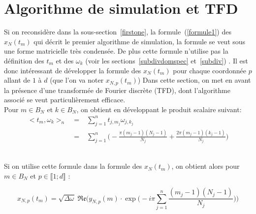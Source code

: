 \section{Algorithme de simulation et TFD}

Si on reconsidère dans la sous-section~\ref{firstone}, la formule~(\ref{formule1}) des $x_N(t_m)$ qui décrit le premier algorithme de simulation, la formule se veut sous une forme
matricielle très condensée. De plus cette formule n'utilise pas la définition des $t_m$ et des $\omega_k$ (voir les sections~\ref{subdivdomspec} et~\ref{subdiv})
. Il est donc intéressant de développer la formule des $x_N(t_m)$ pour chaque coordonnée $p$ allant de $1$ à $d$ (que l'on va noter $x_{N,p}(t_m)$)
Dans cette section, on met en avant la présence d'une transformée de
Fourier discrète (TFD), dont l'algorithme associé se veut particulièrement efficace.\\


\noindent Pour $m \in B_N$ et $k \in B_N$, on obtient en développant le produit scalaire suivant:
\begin{eqnarray*}
  <t_m,\omega_k>_{n} \; &=&  \; \displaystyle\sum_{j = 1}^{n} t_{j,m_j} \omega_{j,k_j} \\ 
  &=& \; \displaystyle\sum_{j = 1}^{n} \biggl( -\frac{\pi (m_j - 1)(N_j - 1)}{N_j} + \frac{2\pi(m_j - 1)(k_j -1)}{N_j} \biggr)
\end{eqnarray*}
 
~\\
\noindent Si on utilise cette formule dans la formule des $x_N(t_m)$, on obtient alors pour $m \in B_N$ et $p \in \llbracket 1;d \rrbracket$ :

\begin{equation*}
  x_{N,p}(t_m) = \sqrt{\Delta \omega} \; \mathfrak{Re} \biggl (y_{N,p}(m) \cdot \exp \biggl(-i \pi \displaystyle\sum_{j = 1}^{n} \frac{(m_j - 1)(N_j - 1)}{N_j} \biggr) \biggr)  
\end{equation*}

